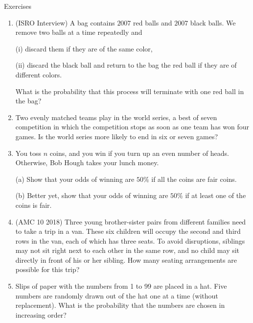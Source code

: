 \begin{xcb}{Exercises}
\begin{enumerate}
\begin{hint}
\end{hint}
\item (ISRO Interview)  A bag contains $2007$ red balls and $2007$ black balls. We remove two balls
at a time repeatedly and\par
(i) discard them if they are of the same color,\par
(ii) discard the black ball and return to the bag the red ball if they are of different
colors.\par
What is the probability that this process will terminate with one red ball in the bag?
\begin{hint}
\end{hint}
\item {} Two evenly matched teams play in the world series, a best of seven competition in which the competition stops as soon as one team has won four games. Is the world series more likely to end in six or seven games?
\item You toss $n$ coins, and you win if you turn up an even number of heads. Otherwise, Bob Hough takes your lunch money.\par
(a)  Show that your odds of winning are $50\%$ if all the coins are fair coins.\par
(b)  Better yet, show that your odds of winning are $50\%$ if at least one of the coins is
fair.\par
\item(AMC 10 2018)  Three young brother-sister pairs from different families need to take a trip in a van. These six children will occupy the second and third rows in the van, each of which has three seats. To avoid disruptions, siblings may not sit right next to each other in the same row, and no child may sit directly in front of his or her sibling. How many seating arrangements are possible for this trip?
\item {} Slips of paper with the numbers from 1 to 99 are placed in a hat. Five numbers are randomly drawn out of the hat one at a time (without replacement). What is the probability that the numbers are chosen in increasing order?
\end{enumerate}
\end{xcb}
